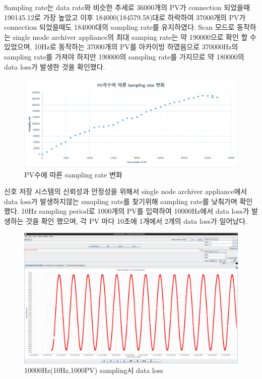 \documentclass[11pt
  , a4paper
  , article
  , oneside
]{memoir}
\begin{document}
	Sampling rate는 data rate와 비슷한 추세로 36000개의 PV가 connection 되었을때 190145.12로 가장 높았고 이후 184000(184579.58)대로 하락하여 37000개의 PV가 connection 되었을때도 184000대의 sampling rate를 유지하였다. Scan 모드로 동작하는 single mode archiver appliance의 최대 samping rate는 약 190000으로 확인 할 수 있었으며, 10Hz로 동작하는 37000개의 PV를 아카이빙 하였음으로 370000Hz의 sampling rate를 가져야 하지만 190000의 sampling rate를 가지므로 약 180000의 data loss가 발생한 것을 확인했다.
	\clearpage
		\begin{figure}[h!]
			\centering
			\includegraphics[width=1\textwidth, height=0.25\textheight]{./images/samplingrate.png}
			\caption{PV수에 따른 sampling rate 변화}
		\end{figure}

신호 저장 시스템의 신뢰성과 안정성을 위해서 single node archiver appliance에서 data loss가 발생하지않는 smapling rate를 찾기위해 sampling rate를 낮춰가며 확인했다. 10Hz sampling period로 1000개의 PV를 입력하여 10000Hz에서 data loss가 발생하는 것을 확인 했으며, 각 PV 마다 10초에 1개에서 2개의 data loss가 일어났다.
		\begin{figure}[h!]
			\centering
			\includegraphics[width=1\textwidth, height=0.5\textheight]{./images/a1.png}
			\caption{10000Hz(10Hz,1000PV) sampling시 data loss}
		\end{figure}
\end{document}

